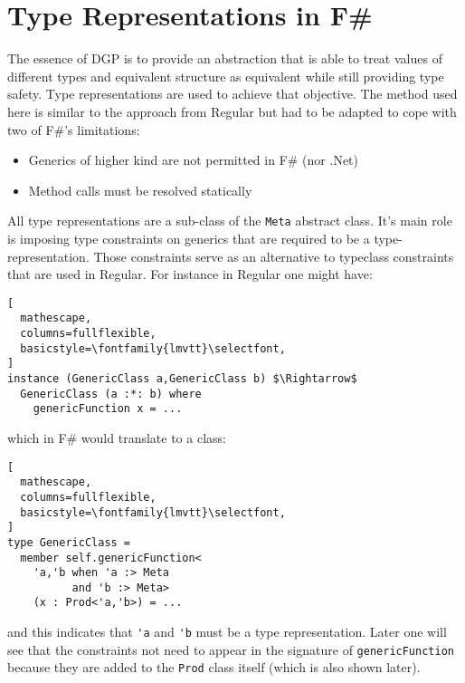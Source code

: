\documentclass{sigplanconf}
\begin{document}
\section{Type Representations in F\#}
The essence of DGP is to provide an abstraction that is able to treat
values of different types and equivalent structure as equivalent while
still providing type safety. Type representations are used to achieve
that objective. The method used here is similar to the approach from
Regular\cite{Regular} but had to be adapted to cope with two of F\#'s
limitations:
\begin{itemize}
\item Generics of higher kind are not permitted in F\# (nor .Net)
\item Method calls must be resolved statically
\end{itemize}
All type representations are a sub-class of the \verb+Meta+ abstract
class. It's main role is imposing type constraints on generics that
are required to be a type-representation. Those constraints serve as
an alternative to typeclass constraints that are used in Regular. For
instance in Regular one might have:
\begin{lstlisting}[
  mathescape,
  columns=fullflexible,
  basicstyle=\fontfamily{lmvtt}\selectfont,
]
instance (GenericClass a,GenericClass b) $\Rightarrow$
  GenericClass (a :*: b) where
    genericFunction x = ...
\end{lstlisting}
which in F\# would translate to a class:
\begin{lstlisting}[
  mathescape,
  columns=fullflexible,
  basicstyle=\fontfamily{lmvtt}\selectfont,
]
type GenericClass =
  member self.genericFunction<
    'a,'b when 'a :> Meta 
          and 'b :> Meta> 
    (x : Prod<'a,'b>) = ...
\end{lstlisting}
and this indicates that \verb+'a+ and \verb+'b+ must be a type
representation. Later one will see that the constraints not need to
appear in the signature of \verb+genericFunction+ because they are
added to the \verb+Prod+ class itself (which is also shown later).
\end{document}
